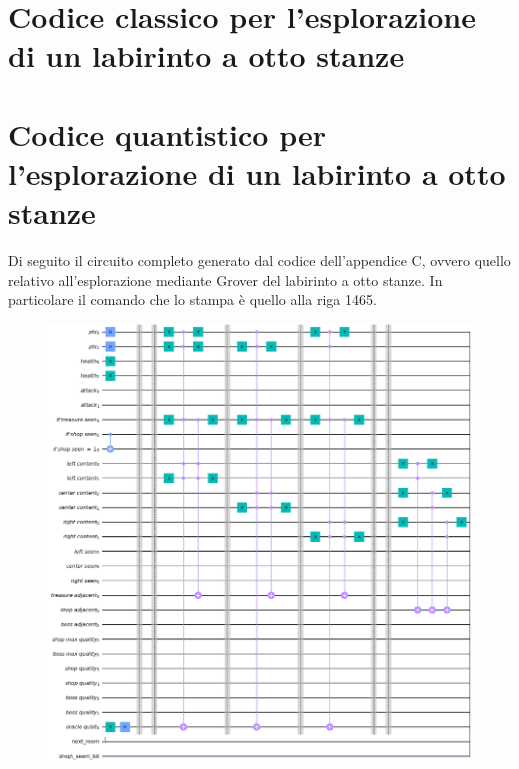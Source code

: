 \documentclass{book}
\theoremstyle{definition}
\theoremstyle{definition}
\theoremstyle{definition}
\theoremstyle{plain}
\theoremstyle{plain}
\theoremstyle{plain}
\theoremstyle{plain}
\begin{document}
\chapter{Codice classico per l'esplorazione di un labirinto a otto stanze}



\chapter{Codice quantistico per l'esplorazione di un labirinto a otto stanze}



Di seguito il circuito completo generato dal codice dell'appendice C, ovvero quello relativo all'esplorazione mediante Grover del labirinto a otto stanze. In particolare il comando che lo stampa è quello alla riga 1465.

\begin{figure}[H]
\begin{center}
    \includegraphics[width=16cm]{immagini_circuito_8_stanze/mega_circ_1.png}
\end{center}
\end{figure}
\end{document}
